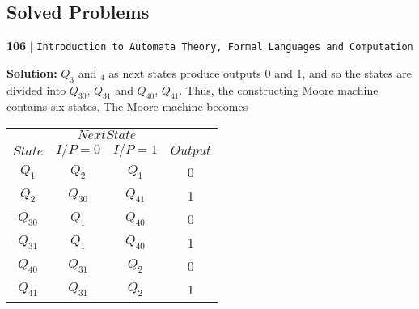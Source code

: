 \documentclass[8pt]{beamer}
\begin{document}
\begin{frame}
\section*{Solved Problems}
\begin{flushleft}
    \textbf{106}\hspace*{0.1cm} \textbf{$|$} \hspace*{0.1cm} \texttt{Introduction to Automata Theory, Formal Languages and Computation}
  \end{flushleft}
  \vspace*{0.5cm}

\textbf{Solution:} $Q_3$ and $_4$ as next states produce outputs 0 and 1, and so the states are divided into $Q_30$, $Q_31$
and $Q_40$, $Q_41$. Thus, the constructing Moore machine contains six states. The Moore machine becomes\\

\begin{center}
\begin{tabular}{cccc}
 \hline

 \hline

 \hline

 \hline
 & \multicolumn{2}{c}{$Next State$}\\
 \cline{2-3}
 $State$ &  $I/P=0$ & $I/P=1$  &  $Output$\\
\hline
$Q_1$  &$Q_2$  & $Q_1$  &  0\\
$Q_2$  &$Q_30$ & $Q_41$& 1\\
$Q_30$ &$Q_1$  & $Q_40$& 0\\
$Q_31$ &$Q_1$  & $Q_40$& 1\\
$Q_40$ &$Q_31$ & $Q_2$& 0\\
$Q_41$ &$Q_31$ & $Q_2$& 1\\
 \hline

 \hline

 \hline

 \hline
\end{tabular}
\end{center}

\vspace*{0.3cm}
\end{frame}
\end{document}
